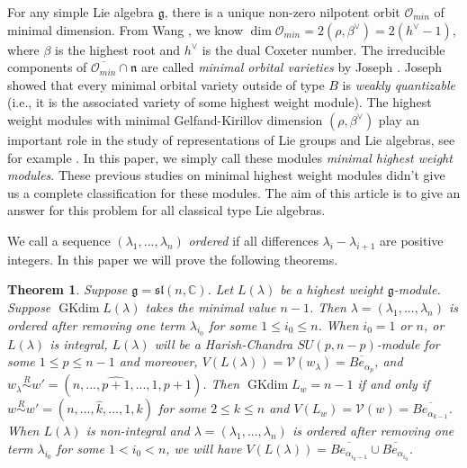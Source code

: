 \documentclass{amsart}[12pt]
\newtheorem{Thm}[Lem]{Theorem}
\newcommand{\gkd}{\operatorname{GKdim}}
\numberwithin{equation}{section}
\begin{document}
For any simple Lie algebra $\mathfrak{g}$, there is a unique non-zero nilpotent orbit $\mathcal{O}_{min}$ of minimal dimension. From Wang \cite{Wang}, we know $\dim {\mathcal {O}}_{min}=2(\rho, \beta^{\vee})=2(h^{\vee}-1)$, where $\beta$ is the highest root and $h^{\vee}$ is the dual Coxeter number. The irreducible components of $\overline{\mathcal{O}_{min}}\cap \mathfrak{n}$ are called \emph{minimal orbital varieties} by Joseph \cite{Jo98}. Joseph showed that every minimal orbital variety outside of type $B$ is \emph{weakly quantizable} (i.e., it is the associated variety of some highest weight module). The highest weight modules with minimal Gelfand-Kirillov dimension $(\rho, \beta^{\vee})$ play an important role in the study of representations of Lie groups and Lie algebras, see for example \cite{BBL, GS, Jo98, Li, Ma,Sun}. In this paper, we simply call these modules \emph{minimal highest weight modules}. These previous studies on minimal highest weight modules didn't give us a complete classification for these modules. The aim of this article is to give an answer for this problem for all classical type Lie algebras.






We call a sequence $(\lambda_1,...,\lambda_n)$  \emph{ordered} if all differences $\lambda_i-\lambda_{i+1}$ are positive integers. In this paper we will prove the following theorems.

\begin{Thm}\label{m2} Suppose $\mathfrak{g}=\mathfrak{sl}(n, \mathbb{C})$. Let $L(\lambda)$ be a highest weight $\mathfrak{g}$-module. Suppose $\gkd L(\lambda)$ takes the minimal value $n-1$. Then $\lambda=(\lambda_1,...,\lambda_n)$ is ordered after removing one term $\lambda_{i_0}$ for some $1\leq i_0\leq n$. When $i_0=1$ or $n$, or $L(\lambda)$ is integral, $L(\lambda)$ will be a Harish-Chandra $SU(p,n-p)$-module for some $1\leq p\leq n-1$ and
	moreover, $V(L(\lambda))=\mathcal{V}(w_{\lambda})=\overline{Be_{\alpha_{p}}}$, and $w_{\lambda}\stackrel{R}{\sim} w'=(n,...,{\widehat{p+1}},...,1,p+1)$. Then $\gkd L_w=n-1$ if and only if   $w \stackrel{R}{\sim} w'=(n,...,\hat{k},...,1,k)$  for  some  $2\leq k\leq n$ and  $V(L_w)=\mathcal{V}(w)=\overline{Be_{\alpha_{k-1}}}$.
When $L(\lambda)$ is non-integral and $\lambda=(\lambda_1,...,\lambda_n)$ is ordered after removing one term $\lambda_{i_0}$ for some $1<i_0<n$, we will have $V(L(\lambda))=\overline{Be_{\alpha_{i_0-1}}}\cup \overline{Be_{\alpha_{i_0}}}$.	
	
\end{Thm}
\end{document}
